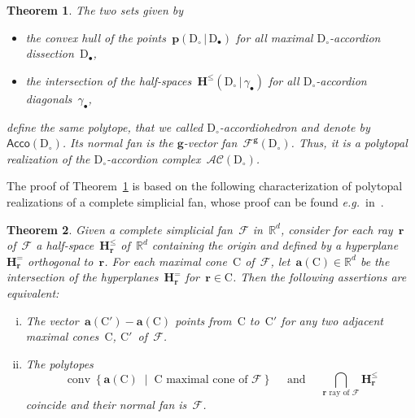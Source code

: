 \documentclass{amsart}
\newtheorem{theorem}{Theorem}%
\theoremstyle{definition}
\newcommand{\R}{\mathbb{R}} %
\renewcommand{\b}[1]{\mathbf{#1}} %
\newcommand{\set}[2]{\left\{ #1 \;\middle|\; #2 \right\}} %
\newcommand{\Acco}{\mathsf{Acco}} %
\newcommand{\Fan}{\mathcal{F}} %
\newcommand{\Cone}{\mathrm{C}} %
\DeclareMathOperator{\conv}{conv} %
\newcommand{\eg}{\textit{e.g.}~} %
\newcommand{\darkblue}{\color{darkblue}} %
\newcommand{\defn}[1]{\textsl{\darkblue #1}} %
\newcommand{\accordionComplex}{\mathcal{AC}} %
\newcommand{\dissection}{\mathrm{D}} %
\newcommand{\gvectorFan}{\mathcal{F}^\mathbf{g}} %
\newcommand{\point}[2]{\mathbf{p}(#1  \,|\, #2)} %
\newcommand{\ray}{\mathbf{r}} %
\newcommand{\hs}{\mathbf{H}^{\le}} %
\newcommand{\HS}[2]{\mathbf{H}^{\le}(#1  \,|\, #2)} %
\newcommand{\hyp}{\mathbf{H}^{=}} %
\begin{document}
\begin{theorem}
\label{thm:accordiohedron}
The two sets given by
\begin{itemize}
\item the convex hull of the points~$\point{\dissection_\circ}{\dissection_\bullet}$ for all maximal $\dissection_\circ$-accordion dissection~$\dissection_\bullet$,
\item the intersection of the half-spaces~$\HS{\dissection_\circ}{\gamma_\bullet}$ for all $\dissection_\circ$-accordion diagonals~$\gamma_\bullet$,
\end{itemize}
define the same polytope, that we called \defn{$\dissection_\circ$-accordiohedron} and denote by~$\Acco(\dissection_\circ)$. Its normal fan is the \mbox{$\b{g}$-vector} fan~$\gvectorFan(\dissection_\circ)$. Thus, it is a polytopal realization of the $\dissection_\circ$-accordion complex~$\accordionComplex(\dissection_\circ)$.
\end{theorem}

The proof of Theorem~\ref{thm:accordiohedron} is based on the following characterization of polytopal realizations of a complete simplicial fan, whose proof can be found \eg in~\cite[Theorem~4.1]{HohlwegLangeThomas}.

\begin{theorem}%
\label{theo:HohlwegLangeThomas}
Given a complete simplicial fan~$\Fan$ in~$\R^d$, consider for each ray~$\ray$ of~$\Fan$ a half-space~$\hs_\ray$ of~$\R^d$ containing the origin and defined by a hyperplane~$\hyp_\ray$ orthogonal to~$\ray$. For each maximal cone~$\Cone$ of~$\Fan$, let~$\b{a}(\Cone) \in \R^d$ be the intersection of the hyperplanes~$\hyp_\ray$ for~$\ray \in \Cone$. Then the following assertions are equivalent:
\begin{enumerate}[(i)]
\item The vector~$\b{a}(\Cone') - \b{a}(\Cone)$ points from~$\Cone$ to~$\Cone'$ for any two adjacent maximal cones~$\Cone$, $\Cone'$~of~$\Fan$.
\item The polytopes
\[
\conv\set{\b{a}(\Cone)}{\Cone \text{ maximal cone of } \Fan} \quad\text{ and }\quad
\bigcap_{\ray \text{ ray of } \Fan} \hs_\ray
\]
coincide and their normal fan is~$\Fan$.
\end{enumerate}
\end{theorem}
\end{document}
